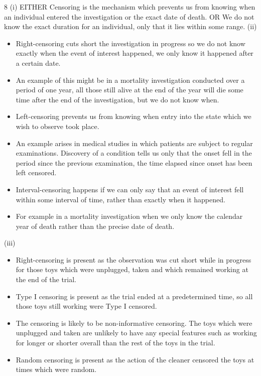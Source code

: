 \documentclass[a4paper,12pt]{article}
\begin{document}
8
(i)
EITHER
Censoring is the mechanism which prevents us from knowing when an
individual entered the investigation or the exact date of death.
OR
We do not know the exact duration for an individual, only that it lies within
some range.
(ii)
\begin{itemize}
\item Right-censoring cuts short the investigation in progress so we do not know exactly when the event of interest happened, we only know it happened after a
certain date.
\item An example of this might be in a mortality investigation conducted over a period of one year, all those still alive at the end of the year will die some time after the end of the investigation, but we do not know when.
\item Left-censoring prevents us from knowing when entry into the state which we
wish to observe took place.
\item An example arises in medical studies in which patients are subject to regular
examinations. Discovery of a condition tells us only that the onset fell in the period since the previous examination, the time elapsed since onset has been left censored.
\item Interval-censoring happens if we can only say that an event of interest fell
within some interval of time, rather than exactly when it happened.
\item For example in a mortality investigation when we only know the calendar year
of death rather than the precise date of death.
\end{itemize}
(iii)
\begin{itemize}
\item Right-censoring is present as the observation was cut short while in progress
for those toys which were unplugged, taken and which remained working at
the end of the trial.
\item Type I censoring is present as the trial ended at a predetermined time, so all
those toys still working were Type I censored.
\item The censoring is likely to be non-informative censoring. The toys which were
unplugged and taken are unlikely to have any special features such as working
for longer or shorter overall than the rest of the toys in the trial.
\item Random censoring is present as the action of the cleaner censored the toys at
times which were random.
\end{itemize}
\end{document}
